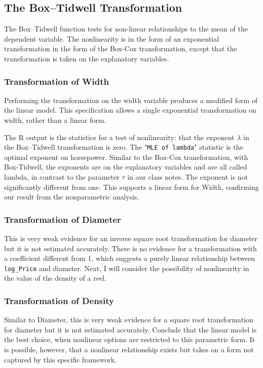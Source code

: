 \documentclass[11pt]{paper}
\begin{document}
\subsection{The Box--Tidwell Transformation}

The Box--Tidwell function tests for non-linear relationships
to the mean of the dependent variable.
The nonlinearity is in the form of an
exponential transformation in the form of the Box-Cox
transformation, except that the transformation is taken
on the explanatory variables.


\subsubsection{Transformation of Width}


Performing the transformation on the 
width variable
produces a modified form of the linear model.
This specification allows a single exponential
transformation on 
width, 
rather than a linear form.



The \textsf{R} output is the statistics for a test of nonlinearity:
that the exponent $\lambda$ in the Box--Tidwell transformation is zero.
%
The "\texttt{MLE of lambda}" statistic is the optimal exponent on horsepower.
Similar to the Box-Cox transformation,
with Box-Tidwell, the exponents are on the explanatory variables
and are all called lambda, in contrast
to the parameter $\tau$ in our class notes.
%  
The exponent is not significantly different from one. 
This supports a linear form for Width,
confirming our result from the nonparametric analysis.



\subsubsection{Transformation of Diameter}





This is very weak evidence for
an inverse square root transformation
for diameter but it is not estimated accurately.
%
There is no evidence for a transformation 
with a coefficient different from 1, 
which suggests
a purely linear relationship between \texttt{log\_Price}
and 
diameter.
Next, I will consider the possibility of nonlinearity 
in the value of the density of a reel. 

\subsubsection{Transformation of Density}




Similar to Diameter, this is very weak evidence for
a square root transformation
for diameter but it is not estimated accurately.
%
Conclude that the linear model is the best choice, 
when nonlinear options are restricted to this parametric form.
It is possible, however, that a nonlinear relationship exists
but takes on a form not captured by this specific framework. 





\end{document}
